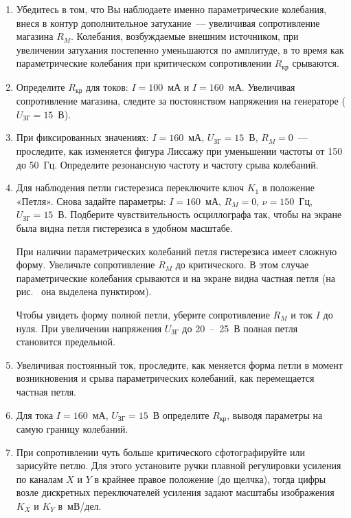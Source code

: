 \begin{lab:task}
\begin{enumerate}
\item
Убедитесь в том, что Вы наблюдаете именно параметрические колебания, внеся в
контур дополнительное затухание~--- увеличивая сопротивление магазина $R_M$.
Колебания, возбуждаемые внешним источником, при увеличении затухания постепенно
уменьшаются по амплитуде, в то время как параметрические колебания при
критическом сопротивлении $R_\text{кр}$ срываются.

\item
Определите $R_\text{кр}$ для токов: $I = 100$~мА и $I = 160$~мА. Увеличивая
сопротивление магазина, следите за постоянством напряжения на генераторе
($U_\text{ЗГ} = 15$~В).

\item
При фиксированных значениях: $I = 160$~мА, $U_\text{ЗГ} = 15$~В, $R_M = 0$~---
проследите, как изменяется фигура Лиссажу при уменьшении частоты от 150 до
50~Гц. Определите резонансную частоту и частоту срыва колебаний.

\item
Для наблюдения петли гистерезиса переключите ключ $K_1$ в положение «Петля».
Снова задайте параметры: $I = 160$~мА, $R_M = 0$, $\nu = 150$~Гц, $U_\text{ЗГ} =
15$~В. Подберите чувствительность осциллографа так, чтобы на экране была видна
петля гистерезиса в удобном масштабе.

При наличии параметрических колебаний петля гистерезиса имеет сложную форму.
Увеличьте сопротивление $R_M$ до критического. В этом случае параметрические
колебания срываются и на экране видна частная петля (на рис.~ она выделена пунктиром).

Чтобы увидеть форму полной петли, уберите сопротивление $R_M$ и ток $I$ до нуля.
При увеличении напряжения $U_\text{ЗГ}$ до 20~--~25~В полная петля становится
предельной.

\item
Увеличивая постоянный ток, проследите, как меняется форма петли в момент
возникновения и срыва параметрических колебаний, как перемещается частная петля.

\item
Для тока $I = 160$~мА, $U_\text{ЗГ} = 15$~В определите $R_\text{кр}$, выводя
параметры на самую границу колебаний.

\item
При сопротивлении чуть больше критического сфотографируйте или зарисуйте петлю.
Для этого установите
ручки плавной регулировки усиления по каналам $X$ и $Y$ в крайнее правое
положение (до щелчка), тогда цифры возле дискретных переключателей усиления
задают масштабы изображения $K_X$ и $K_Y$ в~мВ/дел.


\end{enumerate}
\end{lab:task}
